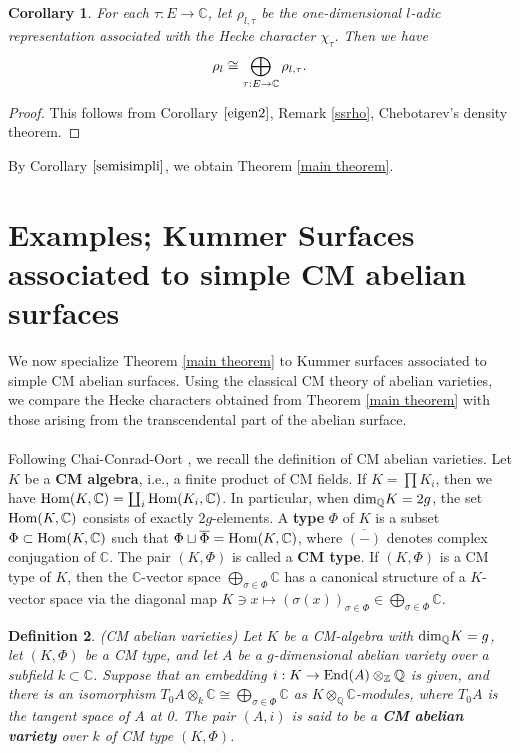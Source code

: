 \documentclass[reqno,a4paper,11pt]{amsart}
\newtheorem{dfn}{Definition}[section]
\newtheorem{cor}[dfn]{Corollary}
\theoremstyle{definition}
\theoremstyle{definition}
\begin{document}
  \begin{cor}\label{semisimpli}For each $\tau : E \to \mathbb{C}$, let $\rho_{l, \tau}$ be the one-dimensional $l$-adic representation associated with the Hecke character $\chi_{\tau}$.  Then we have
      \begin{align}
          \rho_{l}\cong \bigoplus_{\tau : E \to \mathbb{C}}\rho_{l, \tau}.\notag
      \end{align}
  \end{cor}
  \begin{proof}
      This follows from Corollary $\ref{eigen2}$, Remark \ref{ssrho},  Chebotarev's density theorem.
  \end{proof}
  
      By Corollary $\ref{semisimpli}$, we obtain Theorem \ref{main theorem}.
      \section{Examples; Kummer Surfaces associated to simple CM abelian surfaces}We now specialize Theorem \ref{main theorem} to Kummer surfaces associated to simple CM abelian surfaces. Using the classical CM theory of abelian varieties, we compare the Hecke characters obtained from Theorem \ref{main theorem} with those arising from the transcendental part of the abelian surface.
      \\\\\indent Following Chai-Conrad-Oort \cite{cco}, we recall  the definition of CM abelian varieties. Let $K$ be a \textbf{CM algebra}, i.e., a finite product of CM fields.  If $K=\prod K_{i}$, then we have ${\rm Hom}(K, \mathbb{C})=\coprod_{i} {\rm Hom}(K_{i}, \mathbb{C})$. In particular,  when ${\rm dim}_{\mathbb{Q}}K=2g$, the set ${\rm Hom}(K, \mathbb{C})$ consists of exactly $2g$-elements. A \textbf{type} $\Phi$ of $K$ is a subset $\Phi\subset {\rm Hom}(K, \mathbb{C})$ such that $\Phi\sqcup \overline{\Phi}={\rm Hom}(K, \mathbb{C})$, where $\overline{(-)}$ denotes complex conjugation of $\mathbb{C}$. The pair $(K, \Phi)$ is called a \textbf{CM type}. If $(K, \Phi)$ is a CM type of $K$, then the $\mathbb{C}$-vector space $\bigoplus_{\sigma\in\Phi}\mathbb{C}$ has a canonical structure of a $K$-vector space via the diagonal map $K\ni x\mapsto (\sigma(x))_{\sigma\in\Phi}\in \bigoplus_{\sigma\in\Phi}\mathbb{C}$.
      \begin{dfn}(CM abelian varieties) 
          Let $K$ be a CM-algebra with ${\rm dim}_{\mathbb{Q}} K=g$, let $(K, \Phi)$ be a CM type, and  let $A$ be a $g$-dimensional abelian variety over a subfield $k\subset \mathbb{C}$. Suppose that an embedding $i: K\to {\rm End}(A)\otimes_{\mathbb{Z}}{\mathbb{Q}}$ is given, and   there is an isomorphism $T_{0}A\otimes_{k}\mathbb{C}\cong \bigoplus_{\sigma\in \Phi}\mathbb{C}$ as $K\otimes_{\mathbb{Q}}\mathbb{C}$-modules, where $T_{0}A$ is the tangent space of $A$ at 0. The pair $(A, i)$ is said to be  a \textbf{CM abelian variety} over $k$ of CM type $(K, \Phi)$.
      \end{dfn}
\end{document}
